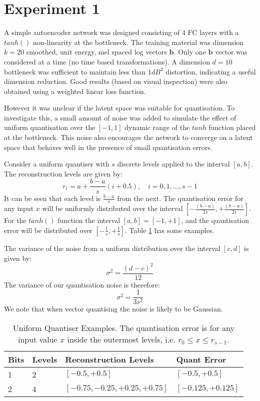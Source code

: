\documentclass{article}
\begin{document}
\section{Experiment 1}

A simple autoencoder network was designed consisting of 4 FC layers with a $tanh()$ non-linearity at the bottleneck.  The training material was dimension $k=20$ smoothed, unit energy, mel spaced log vectors $\mathbf{b}$.  Only one $\mathbf{b}$ vector was considered at a time (no time based transformations). A dimension $d=10$ bottleneck was sufficient to maintain less than $1 dB^2$ distortion, indicating a useful dimension reduction.  Good results (based on visual inspection) were also obtained using a weighted linear loss function.

However it was unclear if the latent space was suitable for quantisation. To investigate this, a small amount of noise was added to simulate the effect of uniform quantisation over the $[-1,1]$ dynamic range of the $tanh$ function placed at the bottleneck.  This noise also encourages the network to converge on a latent space that behaves well in the presence of small quantisation errors.

Consider a uniform quantiser with $s$ discrete levels applied to the interval $[a,b]$.  The reconstruction levels are given by:
\begin{equation}
r_i = a + \frac{b-a}{s}(i+0.5), \quad i=0,1,...,s-1
\end{equation}
It can be seen that each level is $\frac{b-a}{s}$ from the next.  The quantisation error for any input $x$ will be uniformly distributed over the interval $[-\frac{(b-a)}{2s},+\frac{(b-a)}{2s}]$.  For the 
$tanh()$ function the interval $[a,b]=[-1,+1]$, and the quantisation error will be distributed over $[-\frac{1}{s}, + \frac{1}{s}]$.  Table \ref{tab:uniform quantiser} has some examples.

The variance of the noise from a uniform distribution over the interval $[c,d]$ is given by:
\begin{equation}
\sigma^2 = \frac{(d-c)^2}{12}
\end{equation}
The variance of our quantisation noise is therefore:
\begin{equation}
\sigma^2 = \frac{1}{3s^2}
\end{equation}
We note that when vector quantising the noise is likely to be Gaussian.

\begin{table}
\label{tab:uniform quantiser}
\centering
\begin{tabular}{l l l l}
\hline
Bits & Levels & Reconstruction Levels & Quant Error \\
\hline
1 & 2 & $[-0.5,+0.5]$ & $[-0.5,+0.5]$  \\
2 & 4 & $[-0.75, -0.25, +0.25, +0.75]$ & $[-0.125,+0.125]$ \\
\hline
\end{tabular}
\caption{Uniform Quantiser Examples.  The quantisation error is for any input value $x$ inside the outermost levels, i.e. $r_0 \le x \le r_{s-1}$.}
\end{table}
\end{document}
